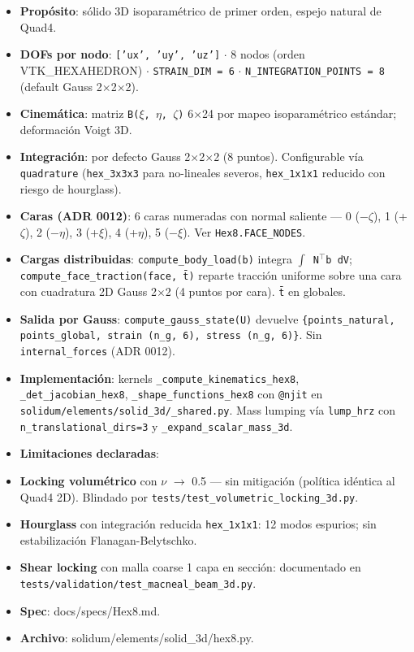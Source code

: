 \documentclass[11pt,letterpaper,oneside]{report}
\begin{document}
\begin{itemize}
  \item \textbf{Propósito}: sólido 3D isoparamétrico de primer orden, espejo natural de Quad4.
  \item \textbf{DOFs por nodo}: \texttt{['ux', 'uy', 'uz']} \ensuremath{\cdot} 8 nodos (orden VTK\_HEXAHEDRON) \ensuremath{\cdot} \texttt{STRAIN\_DIM = 6} \ensuremath{\cdot} \texttt{N\_INTEGRATION\_POINTS = 8} (default Gauss 2\ensuremath{\times}2\ensuremath{\times}2).
  \item \textbf{Cinemática}: matriz \texttt{B(\ensuremath{\xi}, \ensuremath{\eta}, \ensuremath{\zeta})} 6\ensuremath{\times}24 por mapeo isoparamétrico estándar; deformación Voigt 3D.
  \item \textbf{Integración}: por defecto Gauss 2\ensuremath{\times}2\ensuremath{\times}2 (8 puntos). Configurable vía \texttt{quadrature} (\texttt{hex\_3x3x3} para no-lineales severos, \texttt{hex\_1x1x1} reducido con riesgo de hourglass).
  \item \textbf{Caras (ADR 0012)}: 6 caras numeradas con normal saliente --- 0 (−\ensuremath{\zeta}), 1 (+\ensuremath{\zeta}), 2 (−\ensuremath{\eta}), 3 (+\ensuremath{\xi}), 4 (+\ensuremath{\eta}), 5 (−\ensuremath{\xi}). Ver \texttt{Hex8.FACE\_NODES}.
  \item \textbf{Cargas distribuidas}: \texttt{compute\_body\_load(b)} integra \texttt{\ensuremath{\int} N\ensuremath{^{\top}}b dV}; \texttt{compute\_face\_traction(face, t̄)} reparte tracción uniforme sobre una cara con cuadratura 2D Gauss 2\ensuremath{\times}2 (4 puntos por cara). \texttt{t̄} en globales.
  \item \textbf{Salida por Gauss}: \texttt{compute\_gauss\_state(U)} devuelve \texttt{\{points\_natural, points\_global, strain (n\_g, 6), stress (n\_g, 6)\}}. Sin \texttt{internal\_forces} (ADR 0012).
  \item \textbf{Implementación}: kernels \texttt{\_compute\_kinematics\_hex8}, \texttt{\_det\_jacobian\_hex8}, \texttt{\_shape\_functions\_hex8} con \texttt{@njit} en \texttt{solidum/elements/solid\_3d/\_shared.py}. Mass lumping vía \texttt{lump\_hrz} con \texttt{n\_translational\_dirs=3} y \texttt{\_expand\_scalar\_mass\_3d}.
  \item \textbf{Limitaciones declaradas}:
  \item \textbf{Locking volumétrico} con \ensuremath{\nu} \ensuremath{\to} 0.5 --- sin mitigación (política idéntica al Quad4 2D). Blindado por \texttt{tests/test\_volumetric\_locking\_3d.py}.
  \item \textbf{Hourglass} con integración reducida \texttt{hex\_1x1x1}: 12 modos espurios; sin estabilización Flanagan-Belytschko.
  \item \textbf{Shear locking} con malla coarse 1 capa en sección: documentado en \texttt{tests/validation/test\_macneal\_beam\_3d.py}.
  \item \textbf{Spec}: docs/specs/Hex8.md.
  \item \textbf{Archivo}: solidum/elements/solid\_3d/hex8.py.
\end{itemize}
\end{document}
